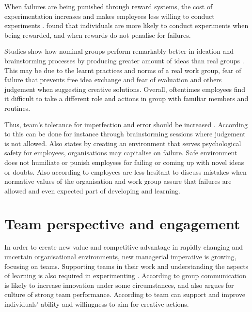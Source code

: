 When failures are being punished through reward systems, the cost of experimentation increases and makes employees less willing to conduct experiments \citep{thomke2001enlightened}.\citet{lee2004mixed} found that individuals are more likely to conduct experiments when being rewarded, and when rewards do not penalise for failures. 

Studies show how nominal groups perform remarkably better in ideation and brainstorming processes by producing greater amount of ideas than real groups \citep{jung2001transformational,sosik1998transformational}. This may be due to the learnt practices and norms of a real work group, fear of failure that prevents free idea exchange and fear of evaluation and others judgement when suggesting creative solutions. Overall, oftentimes employees find it difficult to take a different role and actions in group with familiar members and routines. \citep{jung2001transformational}

Thus, team's tolerance for imperfection and error should be increased \citep{edmondson1999psychological}. According to \citet{thomke2001enlightened} this can be done for instance through brainstorming sessions where judgement is not allowed. Also \citet{garvin2008yours} states by creating an environment that serves psychological safety for employees, organisations may capitalise on failure. Safe environment does not humiliate or punish employees for failing or coming up with novel ideas or doubts. \citet{garvin2008yours, de2001minority,amabile2008creativity, amabile1996assessing} Also according to \citet{edmondson1996learning} employees are less hesitant to discuss mistakes when normative values of the organisation and work group assure that failures are allowed and even expected part of developing and learning. 

\section{Team perspective and engagement}
In order to create new value and competitive advantage in rapidly changing and uncertain organisational environments, new managerial imperative is growing, focusing on teams. Supporting teams in their work and understanding the aspects of learning is also required in experimenting \citep{edmondson1999psychological}. According to \citet{monge1992communication} group communication is likely to increase innovation under some circumstances, and also \citet{katzenbach1993wisdom} argues for culture of strong team performance. According to \citet{amabile1996assessing} team can support and improve individuals' ability and willingness to aim for creative actions. 


